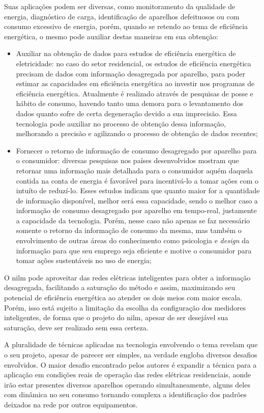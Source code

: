 Suas aplicações podem ser diversas, como monitoramento da qualidade de
energia, diagnóstico de carga, identificação de aparelhos defeituosos
ou com consumo excessivo de energia, porém, quando se retendo ao tema
de eficiência energética, o mesmo pode auxiliar destas maneiras em sua
obtenção:

\begin{itemize}
\item Auxiliar na obtenção de dados para estudos de eficiência
energética de eletricidade: no caso do setor residencial, os estudos
de eficiência energética precisam de dados com informação desagregada
por aparelho, para poder estimar as capacidades em eficiência
energética ao investir nos programas de eficiência energética.
Atualmente é realizado através de pesquisas de posse e hábito de
consumo, havendo tanto uma demora para o levantamento dos dados quanto
sofre de certa degeneração devido a sua imprecisão. Essa tecnologia
pode auxiliar no processo de obtenção dessa informação, melhorando a
precisão e agilizando o processo de obtenção de dados recentes;
\item Fornecer o retorno de informação de consumo desagregado por
aparelho para o consumidor: diversas pesquisas nos países
desenvolvidos mostram que retornar uma informação mais detalhada para
o consumidor aquém daquela contida na conta de energia é favorável
para incentivá-lo a tomar ações com o intuíto de reduzí-lo. Esses
estudos indicam que quanto maior for a quantidade de informação
disponível, melhor será essa capacidade, sendo o melhor caso a
informação de consumo desagregado por aparelho em tempo-real,
justamente a capacidade da tecnologia. Porém, nesse caso não apenas se
faz necessário somente o retorno da informação de consumo da mesma,
mas também o envolvimento de outras áreas do conhecimento como
psicologia e \emph{design} da informação para que seu emprego seja
eficiente e motive o consumidor para tomar ações sustentáveis no uso
de energia;
\end{itemize}

O \acs{nilm} pode aproveitar das redes elétricas inteligentes para
obter a informação desagregada, facilitando a saturação do método e
assim, maximizando seu potencial de eficiência energética ao atender
os dois meios com maior escala. Porém, isso está sujeito a limitação
da escolha da configuração dos medidores inteligentes, de forma que o
projeto do \acs{nilm}, apesar de ser desejável sua saturação, deve ser
realizado sem essa certeza.

A pluralidade de técnicas aplicadas na tecnologia envolvendo o tema
revelam que o seu projeto, apesar de parecer ser simples, na verdade
engloba diversos desafios envolvidos. O maior desafio
encontrado pelos autores é expandir a técnica para a aplicação em
condições reais de operação das redes elétricas residenciais, aonde
irão estar presentes diversos aparelhos operando simultaneamente,
alguns deles com dinâmica no seu consumo tornando complexa a
identificação dos padrões deixados na rede por outros equipamentos.

